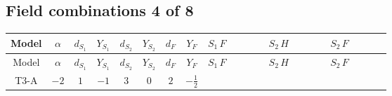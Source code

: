 \documentclass[8pt]{article}
\begin{document}
\begin{landscape}
\subsection*{Field combinations 4 of 8}
\begin{longtable}{@{}cccccccc >{\raggedright\arraybackslash}p{0.21\linewidth} >{\raggedright\arraybackslash}p{0.21\linewidth} >{\raggedright\arraybackslash}p{0.21\linewidth}@{}}
\toprule
Model & $\alpha$ & $d_{S_1}$ & $Y_{S_1}$ & $d_{S_2}$ & $Y_{S_2}$ & $d_F$ & $Y_F$ & $S_1\,F$ & $S_2\,H$ & $S_2\,F$ \\
\midrule
\endfirsthead
\toprule
Model & $\alpha$ & $d_{S_1}$ & $Y_{S_1}$ & $d_{S_2}$ & $Y_{S_2}$ & $d_F$ & $Y_F$ & $S_1\,F$ & $S_2\,H$ & $S_2\,F$ \\
\midrule
\endhead
T3-A & $-2$ & $1$ & $-1$ & $3$ & $0$ & $2$ & $-\frac{1}{2}$ & \scriptsize\adjustbox{max width=\linewidth}{$\begin{gathered} -2 \hbar  \log \left(\frac{\bar{\mu}^{2}}{M_F^2}\right) \overline{y_{1,i_1,r_1}} \overline{y_{1,i_2,r_2}} S_1^2 y_{1,i_1,r_2} y_{1,i_2,r_1} \left(S_1{}^{\dagger }\right){}^2 \\ +2 C_{S_1^\dagger S_1} \hbar  \log \left(\frac{\bar{\mu}^{2}}{M_F^2}\right) \overline{y_{1,i_1,r_1}} S_1 y_{1,i_1,r_1} S_1{}^{\dagger } \\ -2 \hbar  \log \left(\frac{\bar{\mu}^{2}}{M_F^2}\right) \overline{y_{1,i_1,r_1}} S_1^2 y_{1,i_1,r_1} \left(S_1{}^{\dagger }\right){}^2 \lambda_{S_1}^{(1)}^{(1)}\end{gathered}$} & \scriptsize\adjustbox{max width=\linewidth}{$\begin{gathered} -\frac{2 \hbar  \overline{y_{2,i_1,r_1}} \overline{Y_{e,i_2,i_3}} H_{a_1} S_{2,j_1} y_{2,i_2,r_1} Y_{e,i_1,i_3} H_{a_1}{}^{\dagger } S_{2,j_1}{}^{\dagger }}{\sqrt{3} \epsilon } \\ -\frac{2 \hbar  \overline{y_{2,i_1,r_1}} \overline{Y_{e,i_2,i_3}} H_{a_1} S_{2,j_1} y_{2,i_2,r_1} Y_{e,i_1,i_3} H_{a_1}{}^{\dagger } S_{2,j_1}{}^{\dagger }}{\sqrt{3}} \\ -\frac{2 i \sqrt{\frac{2}{3}} \hbar  \overline{y_{2,i_1,r_1}} \overline{Y_{e,i_2,i_3}} H_{a_2} S_{2,j_2} y_{2,i_2,r_1} Y_{e,i_1,i_3} H_{a_1}{}^{\dagger } S_{2,j_1}{}^{\dagger } \mathcal{I}_{H2,a_1,a_2,j_1,j_2}{}^1}{\epsilon }\end{gathered}$} & \scriptsize\adjustbox{max width=\linewidth}{$\begin{gathered} +\frac{2}{3} \hbar  \log \left(\frac{\bar{\mu}^{2}}{M_F^2}\right) \overline{y_{2,i_1,r_1}} \overline{y_{2,i_2,r_2}} S_{2,j_2}^2 y_{2,i_1,r_2} y_{2,i_2,r_1} \left(S_{2,j_1}{}^{\dagger }\right){}^2 \\ +\frac{2 C_{S_2^\dagger S_2} \hbar  \log \left(\frac{\bar{\mu}^{2}}{M_F^2}\right) \overline{y_{2,i_1,r_1}} S_{2,j_1} y_{2,i_1,r_1} S_{2,j_1}{}^{\dagger }}{\sqrt{3}} \\ -\frac{4}{3} \hbar  \log \left(\frac{\bar{\mu}^{2}}{M_F^2}\right) \overline{y_{2,i_1,r_1}} \overline{y_{2,i_2,r_2}} S_{2,j_1} S_{2,j_2} y_{2,i_1,r_2} y_{2,i_2,r_1} S_{2,j_1}{}^{\dagger } S_{2,j_2}{}^{\dagger }\end{gathered}$} \\

\end{longtable}
\end{landscape}
\end{document}
